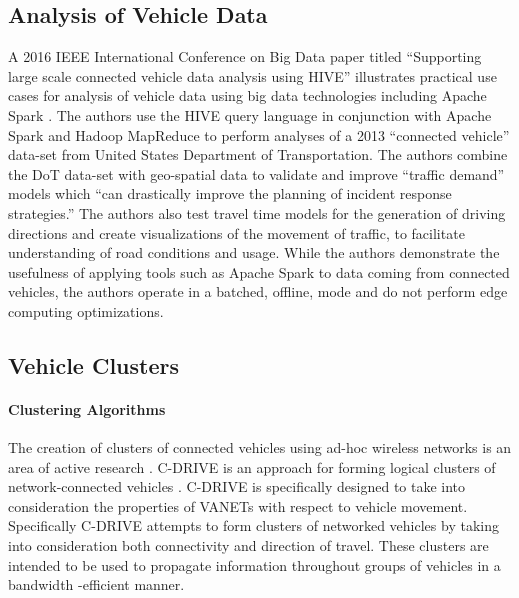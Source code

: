 \documentclass{thesis}
\begin{document}
    \subsection{Analysis of Vehicle Data}
        A 2016 IEEE International Conference on Big Data paper titled ``Supporting large scale
        connected vehicle data analysis using HIVE'' illustrates practical use cases for analysis
        of vehicle data using big data technologies including Apache Spark \cite{cv:hive}. 
        The authors use the HIVE \cite{hive} query language in conjunction with Apache Spark
        \cite{spark} and Hadoop MapReduce \cite{hdfs} to perform analyses of a 2013 ``connected vehicle'' data-set from
        United States Department of Transportation. The authors combine the DoT data-set with
        geo-spatial data to validate and improve ``traffic demand'' models which ``can drastically
        improve the planning of incident response strategies.'' The authors also test travel
        time models for the generation of driving directions and create visualizations of the movement
        of traffic, to facilitate understanding of road conditions and usage. While the authors demonstrate the 
        usefulness of applying tools such as Apache Spark to data coming from connected vehicles, the
        authors operate in a batched, offline, mode and do not perform edge computing optimizations.
    \subsection{Vehicle Clusters}
        \paragraph{Clustering Algorithms}
            The creation of clusters of connected vehicles using ad-hoc wireless networks
            is an area of active research \cite{cdrive}\cite{sbca}\cite{clusterselection}\cite{clustering:mobware}.
            C-DRIVE is an approach for forming logical clusters of network-connected vehicles \cite{cdrive}.
            C-DRIVE is specifically designed to take into consideration the properties
            of VANETs with respect to vehicle movement. Specifically C-DRIVE attempts
            to form clusters of networked vehicles by taking into consideration both
            connectivity and direction of travel. These clusters are intended to be
            used to propagate information throughout groups of vehicles in a bandwidth
            -efficient manner. %
\end{document}
